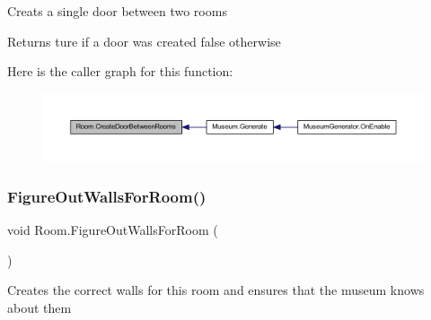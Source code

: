 Creats a single door between two rooms 

\begin{DoxyReturn}{Returns}
ture if a door was created false otherwise
\end{DoxyReturn}
Here is the caller graph for this function\+:
\nopagebreak
\begin{figure}[H]
\begin{center}
\leavevmode
\includegraphics[width=350pt]{class_room_a294bb89a25ac765eca25106ccb4d1955_icgraph}
\end{center}
\end{figure}
\mbox{\label{class_room_aade4dd11dfe01508688d382a49d7c606}} 
\subsubsection{\texorpdfstring{Figure\+Out\+Walls\+For\+Room()}{FigureOutWallsForRoom()}}
{\footnotesize\ttfamily void Room.\+Figure\+Out\+Walls\+For\+Room (\begin{DoxyParamCaption}{ }\end{DoxyParamCaption})\hspace{0.3cm}{\ttfamily [private]}}



Creates the correct walls for this room and ensures that the museum knows about them 

